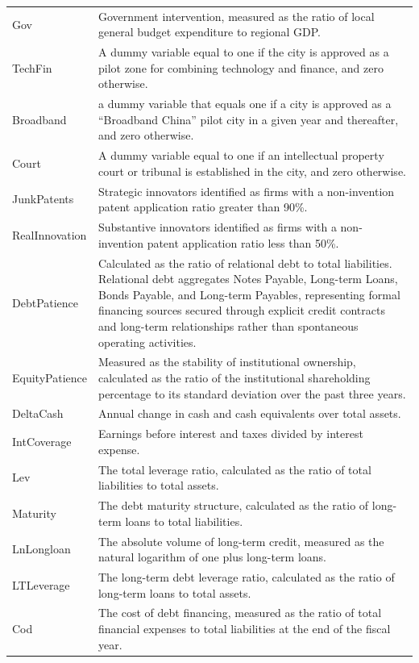 \begin{table}[htbp]
\begin{tabular}{p{2.0cm}p{13.5cm}}
Gov   & Government intervention, measured as the ratio of local general budget expenditure to regional GDP. \\
TechFin   & A dummy variable equal to one if the city is approved as a pilot zone for combining technology and finance, and zero otherwise. \\
Broadband   & a dummy variable that equals one if a city is approved as a “Broadband China” pilot city in a given year and thereafter, and zero otherwise. \\
Court   & A dummy variable equal to one if an intellectual property court or tribunal is established in the city, and zero otherwise. \\
JunkPatents   & Strategic innovators identified as firms with a non-invention patent application ratio greater than 90\%. \\
RealInnovation   & Substantive innovators identified as firms with a non-invention patent application ratio less than 50\%. \\
DebtPatience & Calculated as the ratio of relational debt to total liabilities. Relational debt aggregates Notes Payable, Long-term Loans, Bonds Payable, and Long-term Payables, representing formal financing sources secured through explicit credit contracts and long-term relationships rather than spontaneous operating activities. \\
EquityPatience   & Measured as the stability of institutional ownership, calculated as the ratio of the institutional shareholding percentage to its standard deviation over the past three years. \\
DeltaCash   & Annual change in cash and cash equivalents over total assets. \\
IntCoverage   & Earnings before interest and taxes divided by interest expense. \\
Lev   & The total leverage ratio, calculated as the ratio of total liabilities to total assets. \\
Maturity   & The debt maturity structure, calculated as the ratio of long-term loans to total liabilities. \\
LnLongloan   & The absolute volume of long-term credit, measured as the natural logarithm of one plus long-term loans. \\
LTLeverage   & The long-term debt leverage ratio, calculated as the ratio of long-term loans to total assets. \\
Cod   & The cost of debt financing, measured as the ratio of total financial expenses to total liabilities at the end of the fiscal year. \\

\end{tabular}
\end{table}
